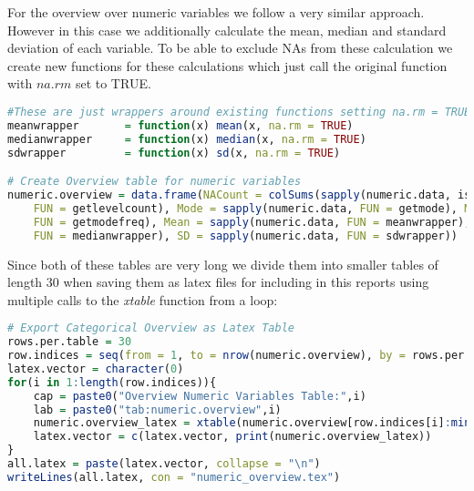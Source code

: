For the overview over numeric variables we follow a very similar approach. However in this case we additionally calculate the mean, median and standard deviation of each variable. To be able to exclude NAs from these calculation we create new functions for these calculations which just call the original function with $na.rm$ set to TRUE.
\begin{lstlisting}[language=R]
#These are just wrappers around existing functions setting na.rm = TRUE
meanwrapper       = function(x) mean(x, na.rm = TRUE)
medianwrapper     = function(x) median(x, na.rm = TRUE)
sdwrapper         = function(x) sd(x, na.rm = TRUE)

# Create Overview table for numeric variables
numeric.overview = data.frame(NACount = colSums(sapply(numeric.data, is.na)), LevelCount = sapply(numeric.data, 
    FUN = getlevelcount), Mode = sapply(numeric.data, FUN = getmode), ModeFrequency = sapply(numeric.data, 
    FUN = getmodefreq), Mean = sapply(numeric.data, FUN = meanwrapper), Median = sapply(numeric.data, 
    FUN = medianwrapper), SD = sapply(numeric.data, FUN = sdwrapper))
\end{lstlisting} 
Since both of these tables are very long we divide them into smaller tables of length 30 when saving them as latex files for including in this reports using multiple calls to the \textit{xtable} function from a loop:
\begin{lstlisting}[language=R]
# Export Categorical Overview as Latex Table
rows.per.table = 30
row.indices = seq(from = 1, to = nrow(numeric.overview), by = rows.per.table)
latex.vector = character(0)
for(i in 1:length(row.indices)){
    cap = paste0("Overview Numeric Variables Table:",i)
    lab = paste0("tab:numeric.overview",i)
    numeric.overview_latex = xtable(numeric.overview[row.indices[i]:min(row.indices[i] + rows.per.table - 1, nrow(numeric.overview)),,drop = FALSE], caption = cap, label =lab)
    latex.vector = c(latex.vector, print(numeric.overview_latex))
}
all.latex = paste(latex.vector, collapse = "\n")
writeLines(all.latex, con = "numeric_overview.tex")
\end{lstlisting} 


